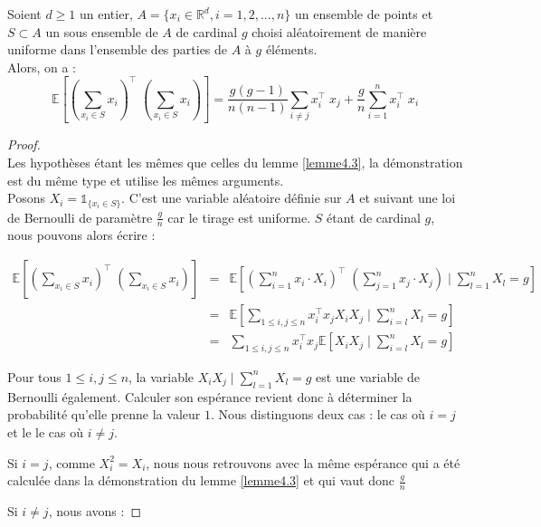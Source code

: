 \documentclass[12pt,a4paper]{book}
\newcommand{\R}{\mathbb{R}}
\newcommand{\E}{\mathbb{E}}
\newcommand{\1}{\mathds{1}}
\begin{document}
		
	\begin{env_lemme}\label{lemme4.4}
		Soient $d \geq 1$ un entier, $A = \{ x_i \in \R^d, i=1,2, ..., n \}$ un ensemble de points et $S \subset A$ un sous ensemble de $A$ de cardinal $g$ choisi aléatoirement de manière uniforme dans l'ensemble des parties de $A$ à $g$ éléments.\\
		Alors, on a :
		$$
			\E \left[ \left( \sum_{x_i \in S} x_i \right)^\intercal \; \left( \sum_{x_i \in S} x_i \right) \right] = \frac{g(g-1)}{n(n-1)} \sum_{i \neq j} x_i^\intercal \; x_j + \frac{g}{n} \sum_{i=1}^n x_i^\intercal \; x_i
		$$		
	\end{env_lemme}	
	
	\begin{proof}
		~\\
		Les hypothèses étant les mêmes que celles du lemme \ref{lemme4.3}, la démonstration est du même type et utilise les mêmes arguments.\\
		Posons $X_i = \1_{\{x_i \in S\}}$. C'est une variable aléatoire définie sur $A$ et suivant une loi de Bernoulli de paramètre $\frac{g}{n}$ car le tirage est uniforme. $S$ étant de cardinal $g$, nous pouvons alors écrire :
		
		\begin{eqnarray*}
			\E \left[ \left( \sum_{x_i \in S} x_i \right)^\intercal \; \left( \sum_{x_i \in S} x_i \right) \right] &=& \E \left[ \left(\sum_{i=1}^n x_i \cdot X_i \right)^\intercal \; \left(\sum_{j=1}^n x_j \cdot X_j \right) \; | \; \sum_{l=1}^n X_l = g \right]\\
			&=& \E \left[\sum_{ 1 \leq i,j \leq n} x_i^\intercal x_j  X_i X_j \; | \; \sum_{i=l}^n X_l = g \right] \\
			&=& \sum_{ 1 \leq i,j \leq n} x_i^\intercal x_j \E \left[ X_i X_j \; | \; \sum_{i=l}^n X_l = g \right]
		\end{eqnarray*}
		
		Pour tous $1 \leq i,j \leq n$, la variable $X_i X_j \; | \; \sum_{l=1}^n X_l = g$  est une variable de Bernoulli également. Calculer son espérance revient donc à déterminer la probabilité qu'elle prenne la valeur $1$. Nous distinguons deux cas : le cas où $i=j$ et le le cas où $i \neq j$.
		
		Si $i=j$, comme $X_i^2=X_i$, nous nous retrouvons avec la même espérance qui a été calculée dans la démonstration du lemme \ref{lemme4.3} et qui vaut donc $\frac{g}{n}$
		
		Si $i \neq j$, nous avons :
		

\end{proof}
\end{document}
